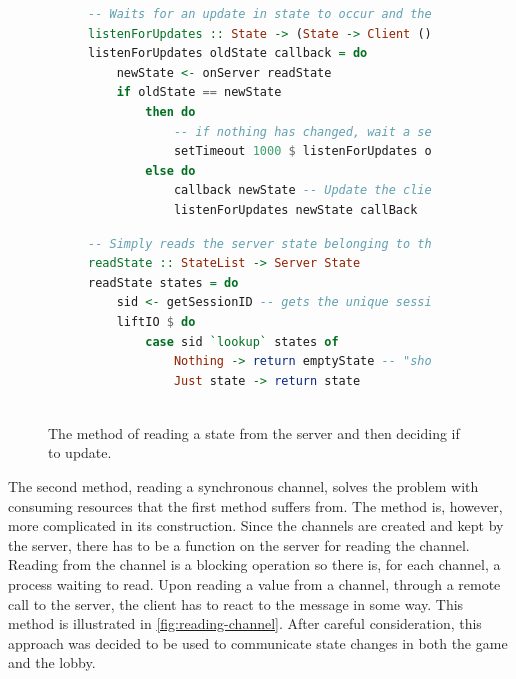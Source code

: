\documentclass[a4paper]{article}
\begin{document}
\begin{figure}[h!]

\begin{subfigure}[]{\textwidth}
\begin{lstlisting}[language=Haskell]
-- Waits for an update in state to occur and then updates if it has
listenForUpdates :: State -> (State -> Client ()) -> Client ()
listenForUpdates oldState callback = do
    newState <- onServer readState
    if oldState == newState 
        then do
            -- if nothing has changed, wait a second before checking again
            setTimeout 1000 $ listenForUpdates oldState callback
        else do
            callback newState -- Update the client in some way
            listenForUpdates newState callBack
\end{lstlisting}
\end{subfigure}

\begin{subfigure}[]{\textwidth}
\begin{lstlisting}[language=Haskell]
-- Simply reads the server state belonging to that client
readState :: StateList -> Server State
readState states = do
    sid <- getSessionID -- gets the unique session id
    liftIO $ do
        case sid `lookup` states of
            Nothing -> return emptyState -- "should not happen"
            Just state -> return state
    
\end{lstlisting}
\end{subfigure}
\caption{The method of reading a state from the server and then deciding if to update.}
\label{fig:reading-state}
\end{figure}

The second method, reading a synchronous channel, solves the problem with consuming resources that the first method suffers from. The method is, however, more complicated in its construction. Since the channels are created and kept by the server, there has to be a function on the server for reading the channel. Reading from the channel is a blocking operation so there is, for each channel, a process waiting to read. Upon reading a value from a channel, through a remote call to the server, the client has to react to the message in some way. This method is illustrated in \cref{fig:reading-channel}. After careful consideration, this approach was decided to be used to communicate state changes in both the game and the lobby.
\end{document}
